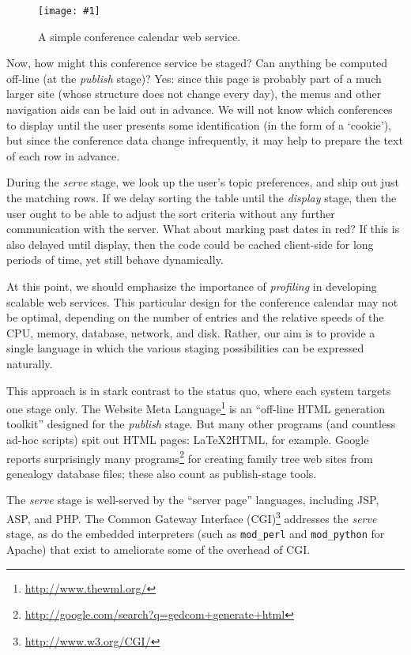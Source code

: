 \documentclass{elsart}
\newcommand{\myfig}[3]{%
  \begin{figure}[tbp]%
    #3%
    \caption{#2}%
    \label{fig:#1}%
  \end{figure}}
\newcommand{\screenshot}[2]{%
  \myfig{#1}{#2}
  {\centering%
    \texttt{[image: \#1]}}}
\begin{document}
\screenshot{confcal}{A simple conference calendar web service.}

Now, how might this conference service be staged?  Can
anything be computed off-line (at the \emph{publish} stage)?
Yes: since this page is probably part of a much larger site
(whose structure does not change every day), the menus and
other navigation aids can be laid out in advance.  We will
not know which conferences to display until the user
presents some identification (in the form of a `cookie'),
but since the conference data change infrequently, it may
help to prepare the text of each row in advance.

During the \emph{serve} stage, we look up the user's topic
preferences, and ship out just the matching rows.  If we delay
sorting the table until the \emph{display} stage, then the user
ought to be able to adjust the sort criteria without any
further communication with the server.  What about marking
past dates in red?  If this is also delayed until display,
then the code could be cached client-side for long periods
of time, yet still behave dynamically.

At this point, we should emphasize the importance of \emph{profiling}
in developing scalable web services.  This particular design for the
conference calendar may not be optimal, depending on the number of
entries and the relative speeds of the CPU, memory, database, network,
and disk.  Rather, our aim is to provide a single language in which
the various staging possibilities can be expressed naturally.

This approach is in stark contrast to the status quo, where each
system targets one stage only.  The Website Meta
Language\footnote{\url{http://www.thewml.org/}} is an ``off-line HTML
generation toolkit'' designed for the \emph{publish} stage.  But many
other programs (and countless ad-hoc scripts) spit out HTML pages:
\LaTeX2HTML, for example.  Google reports surprisingly many
programs\footnote{\url{http://google.com/search?q=gedcom+generate+html}}
for creating family tree web sites from genealogy database files;
these also count as publish-stage tools.

The \emph{serve} stage is well-served by the ``server page''
languages, including
JSP,
ASP, and
PHP.  The Common Gateway Interface
(CGI)\footnote{\url{http://www.w3.org/CGI/}} addresses the
\emph{serve} stage, as do the embedded interpreters (such as
\texttt{mod\_perl} and \texttt{mod\_python} for Apache) that exist to
ameliorate some of the overhead of CGI.
\end{document}
